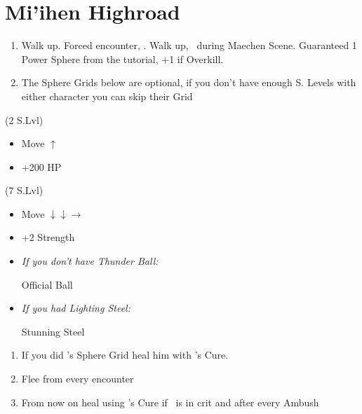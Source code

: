 \chapter{Mi'ihen Highroad}

\begin{enumerate}
    \item Walk up. Forced encounter, \sd. Walk up, \sd\ during Maechen Scene. Guaranteed 1 Power Sphere from the tutorial, +1 if Overkill.
    \item The Sphere Grids below are optional, if you don't have enough S. Levels with either character you can skip their Grid
\end{enumerate}
\begin{spheregrid}
    \begin{itemize}
        \tidusf (2 S.Lvl)
        \begin{itemize}
            \item Move $\uparrow$
            \item +200 HP
        \end{itemize}
    \end{itemize}
    \begin{itemize}
        \wakkaf (7 S.Lvl)
        \begin{itemize}
            \item Move $\downarrow\downarrow\rightarrow$
            \item +2 Strength
        \end{itemize}
    \end{itemize}
\end{spheregrid}
\begin{equip}
    \begin{itemize}
        \item \textit{If you don't have Thunder Ball:}
            \begin{itemize}
                \wakkaf Official Ball
            \end{itemize}
        \item \textit{If you had Lighting Steel:}
            \begin{itemize}
                \tidusf Stunning Steel
            \end{itemize}
    \end{itemize}
\end{equip}
\begin{enumerate}[resume]
    \item If you did \tidus's Sphere Grid heal him with \yuna's Cure. \formation{\tidus}{\wakka}{\auron}
    \item Flee from every encounter
    \item From now on heal using \yuna's Cure if \tidus\ is in crit and after every Ambush
\end{enumerate}
